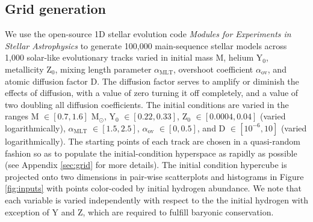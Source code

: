 \documentclass[manuscript]{aastex}
\begin{document}
\subsection{Grid generation}
\label{sec:models}
We use the open-source 1D stellar evolution code \emph{Modules for Experiments in Stellar Astrophysics} \citep[MESA,][]{2015ApJS..220...15P} to generate 100,000 main-sequence stellar models across 1,000 solar-like evolutionary tracks varied in initial mass M, helium Y$_0$, metallicity Z$_0$, mixing length parameter $\alpha_{\text{MLT}}$, overshoot coefficient $\alpha_{\text{ov}}$, and atomic diffusion factor D. The diffusion factor serves to amplify or diminish the effects of diffusion, with a value of zero turning it off completely, and a value of two doubling all diffusion coefficients. The initial conditions are varied in the ranges M $\in [0.7, 1.6]$ M$_\odot$, Y$_0$ $\in [0.22, 0.33]$, Z$_0$ $\in [0.0004, 0.04]$ (varied logarithmically), $\alpha_{\text{MLT}}$ $\in [1.5, 2.5]$, $\alpha_{\text{ov}}$ $\in [0, 0.5]$, and D $\in [10^{-6}, 10]$ (varied logarithmically). The starting points of each track are chosen in a quasi-random fashion so as to populate the initial-condition hyperspace as rapidly as possible (see Appendix \ref{sec:grid} for more details). The initial condition hypercube is projected onto two dimensions in pair-wise scatterplots and histograms in Figure \ref{fig:inputs} with points color-coded by initial hydrogen abundance. We note that each variable is varied independently with respect to the the initial hydrogen with exception of Y and Z, which are required to fulfill baryonic conservation. 
\end{document}
